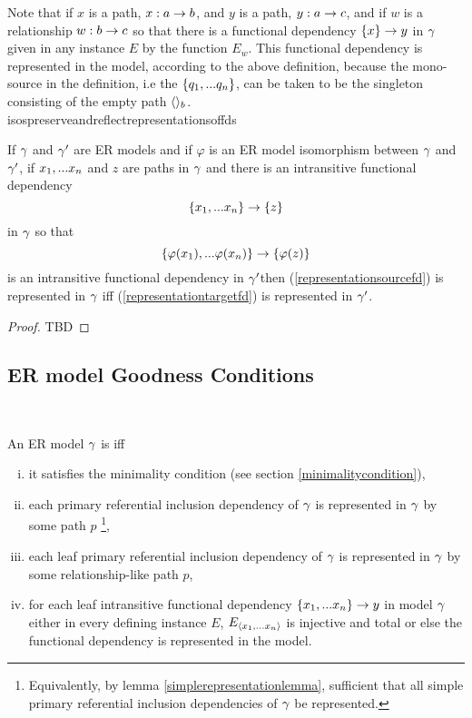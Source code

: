 Note that  if $x$ is a path, $x:a \rightarrow b$, and $y$ is a path, $y: a \rightarrow c$, and if $w$ is a
relationship $w: b \rightarrow c$ so that there is a functional dependency $\left\{x\right\} \rightarrow y$ in $\gamma$
given in any instance $E$ by the function $E_w$. This functional dependency is represented in the model, according to the above definition, because the mono-source in the definition, i.e the $\left\{q_1,...q_n\right\}$,
can be taken to be the singleton consisting of the empty path $\langle\rangle_b$. \\

isospreserveandreflectrepresentationsoffds
\begin{lemma}
\label{isospreserveandreflectrepresentationsoffds}
If $\gamma$ and $\gamma'$ are ER models and  if  $\varphi$ is an ER model isomorphism between $\gamma$  and $\gamma'$,  if $x_1,...x_n$ and $z$ are paths in $\gamma$
and there is an  intransitive functional dependency
\begin{equation}
\label{representationsourcefd}
\left\{x_1,...x_n\right\} \rightarrow \left\{z\right\}
\end{equation} 
in $\gamma$
so that
\begin{equation}
\label{representationtargetfd}
\left\{\varphi(x_1),...\varphi(x_n)\right\} \rightarrow \left\{\varphi(z)\right\}
\end{equation}
is an intransitive  functional dependency in $\gamma'$then
(\ref{representationsourcefd}) is represented in $\gamma$ iff
(\ref{representationtargetfd}) is represented in $\gamma'$.
\end{lemma}
\begin{proof}
TBD
\end{proof}

\subsection{ER model Goodness Conditions}\
\begin{definition}
\noindent An ER model $\gamma$ is  
 iff 
\begin{enumerate} [(i)]
\item{
it satisfies the minimality condition (see section \ref{minimalitycondition}),
}
\item{ 
each primary referential inclusion dependency of $\gamma$ is represented in $\gamma$ by some path $p$ \footnote{Equivalently, by lemma
\ref{simplerepresentationlemma}, sufficient that all simple primary referential inclusion dependencies of $\gamma$ be represented.},
}
\item{ 
each leaf primary referential inclusion dependency of $\gamma$ is represented in $\gamma$ by some relationship-like path $p$, 
}
\item{
for each leaf intransitive functional dependency $\left\{x_1,...x_n\right\} \rightarrow y$ in model $\gamma$
either in every defining instance $E$, $E_{\langle x_1,...x_n\rangle}$ is injective and total
or else the functional dependency is represented in the model.
}
\end{enumerate}
\end{definition}

